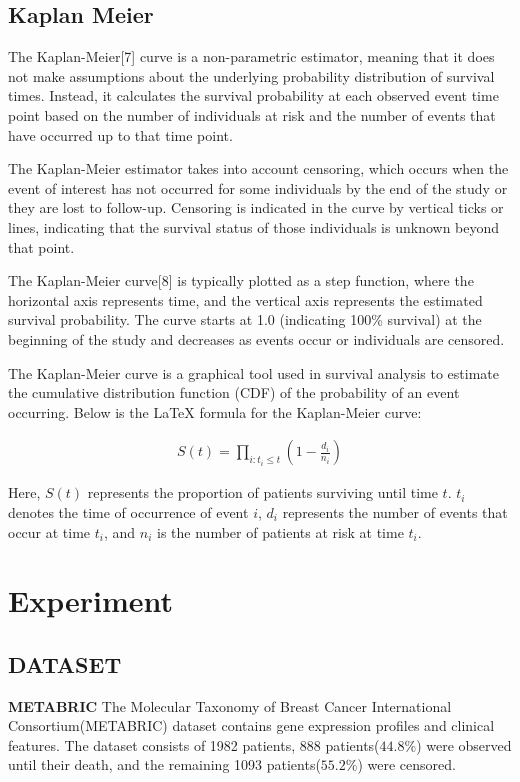 \documentclass[conference]{IEEEconf}
\begin{document}
\subsection{Kaplan Meier}
The Kaplan-Meier[7] curve is a non-parametric estimator, meaning that it does not make assumptions about the underlying probability distribution of survival times. Instead, it calculates the survival probability at each observed event time point based on the number of individuals at risk and the number of events that have occurred up to that time point.

The Kaplan-Meier estimator takes into account censoring, which occurs when the event of interest has not occurred for some individuals by the end of the study or they are lost to follow-up. Censoring is indicated in the curve by vertical ticks or lines, indicating that the survival status of those individuals is unknown beyond that point.

The Kaplan-Meier curve[8] is typically plotted as a step function, where the horizontal axis represents time, and the vertical axis represents the estimated survival probability. The curve starts at 1.0 (indicating 100\% survival) at the beginning of the study and decreases as events occur or individuals are censored.

The Kaplan-Meier curve is a graphical tool used in survival analysis to estimate the cumulative distribution function (CDF) of the probability of an event occurring. Below is the LaTeX formula for the Kaplan-Meier curve:

\begin{eqnarray}
S(t) = \prod_{i:t_i \leq t} \left(1 - \frac{d_i}{n_i}\right)
\end{eqnarray}

Here, $S(t)$ represents the proportion of patients surviving until time $t$. $t_i$ denotes the time of occurrence of event $i$, $d_i$ represents the number of events that occur at time $t_i$, and $n_i$ is the number of patients at risk at time $t_i$.
\section{Experiment}
\subsection{DATASET}
\textbf{METABRIC} The Molecular Taxonomy of Breast Cancer International Consortium(METABRIC) dataset contains gene expression profiles and clinical features. The dataset consists of 1982 patients, 888 patients($44.8\%$) were observed until their death, and the remaining 1093 patients($55.2\%$) were censored.
\end{document}
